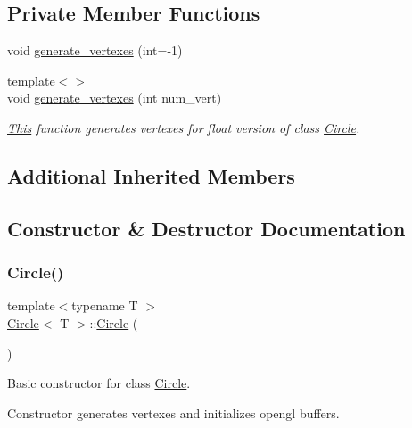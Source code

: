 \subsection*{Private Member Functions}
\begin{DoxyCompactItemize}
\item 
void \mbox{\hyperlink{classCircle_a07ce44d6b3a70ee7cbcf19e02e50c361}{generate\+\_\+vertexes}} (int=-\/1)
\item 
{\footnotesize template$<$$>$ }\\void \mbox{\hyperlink{classCircle_a5c5d9e9bf7ddada0681ad6977e4469f6}{generate\+\_\+vertexes}} (int num\+\_\+vert)
\begin{DoxyCompactList}\small\item\em \mbox{\hyperlink{classThis}{This}} function generates vertexes for float version of class \mbox{\hyperlink{classCircle}{Circle}}. \end{DoxyCompactList}\end{DoxyCompactItemize}
\subsection*{Additional Inherited Members}


\subsection{Constructor \& Destructor Documentation}
\mbox{\label{classCircle_a0a298ea0e982a94a60091aeb2767f6e4}} 
\subsubsection{\texorpdfstring{Circle()}{Circle()}\hspace{0.1cm}{\footnotesize\ttfamily [1/3]}}
{\footnotesize\ttfamily template$<$typename T $>$ \\
\mbox{\hyperlink{classCircle}{Circle}}$<$ T $>$\+::\mbox{\hyperlink{classCircle}{Circle}} (\begin{DoxyParamCaption}{ }\end{DoxyParamCaption})}



Basic constructor for class \mbox{\hyperlink{classCircle}{Circle}}. 

Constructor generates vertexes and initializes opengl buffers. \mbox{\label{classCircle_ad4ee8eadfd4201a937af204ac4e6ec37}} 
